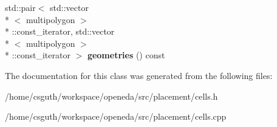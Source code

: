 \begin{DoxyCompactItemize}
\item 
\hypertarget{classophidian_1_1placement_1_1cells_af9ddcd87b30ea1061e3c09948c48102d}{std\-::pair$<$ std\-::vector\\*
$<$ multipolygon $>$\\*
\-::const\-\_\-iterator, std\-::vector\\*
$<$ multipolygon $>$\\*
\-::const\-\_\-iterator $>$ {\bfseries geometries} () const }\label{classophidian_1_1placement_1_1cells_af9ddcd87b30ea1061e3c09948c48102d}

\end{DoxyCompactItemize}


The documentation for this class was generated from the following files\-:\begin{DoxyCompactItemize}
\item 
/home/csguth/workspace/openeda/src/placement/cells.\-h\item 
/home/csguth/workspace/openeda/src/placement/cells.\-cpp\end{DoxyCompactItemize}
